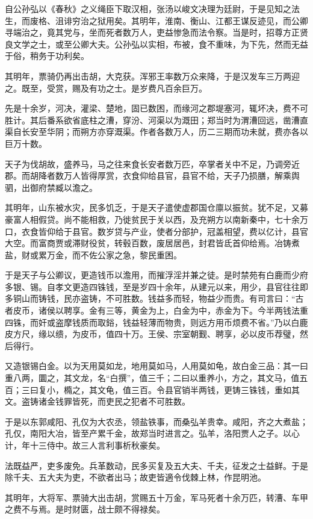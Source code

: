 \documentclass[]{article}
\begin{document}
自公孙弘以《春秋》之义绳臣下取汉相，张汤以峻文决理为廷尉，于是见知之法生，而废格、沮诽穷治之狱用矣。其明年，淮南、衡山、江都王谋反迹见，而公卿寻端治之，竟其党与，坐而死者数万人，吏益惨急而法令察。当是时，招尊方正贤良文学之士，或至公卿大夫。公孙弘以实相，布被，食不重味，为下先，然而无益于俗，稍务于功利矣。

其明年，票骑仍再出击胡，大克获。浑邪王率数万众来降，于是汉发车三万两迎之。既至，受赏，赐及有功之士。是岁费凡百余巨万。

先是十余岁，河决，灌梁、楚地，固已数困，而缘河之郡堤塞河，辄坏决，费不可胜计。其后番系欲省底柱之漕，穿汾、河渠以为溉田；郑当时为渭漕回远，凿漕直渠自长安至华阴；而朔方亦穿溉渠。作者各数万人，历二三期而功未就，费亦各以巨万十数。

天子为伐胡故，盛养马，马之往来食长安者数万匹，卒掌者关中不足，乃调旁近郡。而胡降者数万人皆得厚赏，衣食仰给县官，县官不给，天子乃损膳，解乘舆驷，出御府禁臧以澹之。

其明年，山东被水灾，民多饥乏，于是天子遣使虚郡国仓廪以振贫。犹不足，又募豪富人相假贷。尚不能相救，乃徙贫民于关以西，及充朔方以南新秦中，七十余万口，衣食皆仰给于县官。数岁贷与产业，使者分部护，冠盖相望，费以亿计，县官大空。而富商贾或滞财役贫，转毂百数，废居居邑，封君皆氐首仰给焉。冶铸煮盐，财或累万金，而不佐公家之急，黎民重困。

于是天子与公卿议，更造钱币以澹用，而摧浮淫并兼之徒。是时禁苑有白鹿而少府多银、锡。自孝文更造四铢钱，至是岁四十余年，从建元以来，用少，县官往往即多铜山而铸钱，民亦盗铸，不可胜数。钱益多而轻，物益少而贵。有司言曰：``古者皮币，诸侯以聘享。金有三等，黄金为上，白金为中，赤金为下。今半两钱法重四铢，而奸或盗摩钱质而取鋊，钱益轻薄而物贵，则远方用币烦费不省。''乃以白鹿皮方尺，缘以缋，为皮币，值四十万。王侯、宗室朝觐、聘享，必以皮币荐璧，然后得行。

又造银锡白金。以为天用莫如龙，地用莫如马，人用莫如龟，故白金三品：其一曰重八两，圜之，其文龙，名``白撰''，值三千；二曰以重养小，方之，其文马，值五百；三曰复小，橢之，其文龟，值三百。令县官销半两钱，更铸三铢钱，重如其文。盗铸诸金钱罪皆死，而吏民之犯者不可胜数。

于是以东郭咸阳、孔仅为大农丞，领盐铁事，而桑弘羊贵幸。咸阳，齐之大煮盐；孔仅，南阳大冶，皆至产累千金，故郑当时进言之。弘羊，洛阳贾人之子。以心计，年十三侍中。故三人言利事析秋豪矣。

法既益严，吏多废免。兵革数动，民多买复及五大夫、千夫，征发之士益鲜。于是除千夫、五大夫为吏，不欲者出马；故吏皆適令伐棘上林，作昆明池。

其明年，大将军、票骑大出击胡，赏赐五十万金，军马死者十余万匹，转漕、车甲之费不与焉。是时财匮，战士颇不得禄矣。
\end{document}
